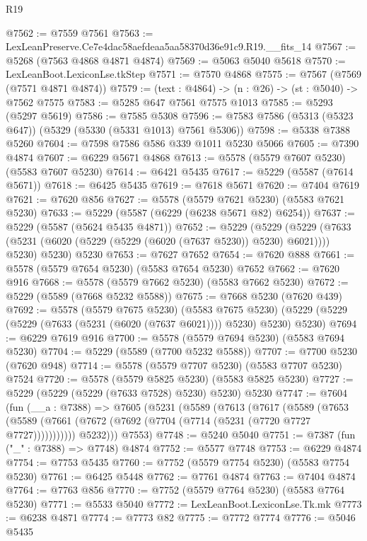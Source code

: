 \begin{lexlean}{R19}
\begin{coremodule}
@7562 := @7559 @7561
@7563 := LexLeanPreserve.Ce7e4dac58aefdeaa5aa58370d36e91c9.R19.__fits_14
@7567 := @5268 (@7563 @4868 @4871 @4874)
@7569 := @5063 @5040 @5618
@7570 := LexLeanBoot.LexiconLse.tkStep
@7571 := @7570 @4868
@7575 := @7567 (@7569 (@7571 @4871 @4874))
@7579 := (text : @4864) -> (n : @26) -> (st : @5040) -> @7562 @7575
@7583 := @5285 @647 @7561 @7575 @1013
@7585 := @5293 (@5297 @5619)
@7586 := @7585 @5308
@7596 := @7583 @7586 (@5313 (@5323 @647)) (@5329 (@5330 (@5331 @1013) @7561 @5306))
@7598 := @5338 @7388 @5260
@7604 := @7598 @7586 @586 @339 @1011 @5230 @5066
@7605 := @7390 @4874
@7607 := @6229 @5671 @4868
@7613 := @5578 (@5579 @7607 @5230) (@5583 @7607 @5230)
@7614 := @6421 @5435
@7617 := @5229 (@5587 (@7614 @5671))
@7618 := @6425 @5435
@7619 := @7618 @5671
@7620 := @7404 @7619
@7621 := @7620 @856
@7627 := @5578 (@5579 @7621 @5230) (@5583 @7621 @5230)
@7633 := @5229 (@5587 (@6229 (@6238 @5671 @82) @6254))
@7637 := @5229 (@5587 (@5624 @5435 @4871))
@7652 := @5229
    (@5229
      (@5229 (@7633 (@5231 (@6020 (@5229 (@5229 (@6020 (@7637 @5230)) @5230) @6021)))) @5230)
      @5230)
    @5230
@7653 := @7627 @7652
@7654 := @7620 @888
@7661 := @5578 (@5579 @7654 @5230) (@5583 @7654 @5230) @7652
@7662 := @7620 @916
@7668 := @5578 (@5579 @7662 @5230) (@5583 @7662 @5230)
@7672 := @5229 (@5589 (@7668 @5232 @5588))
@7675 := @7668 @5230 (@7620 @439)
@7692 := @5578
    (@5579 @7675 @5230)
    (@5583 @7675 @5230)
    (@5229 (@5229 (@5229 (@7633 (@5231 (@6020 (@7637 @6021)))) @5230) @5230) @5230)
@7694 := @6229 @7619 @916
@7700 := @5578 (@5579 @7694 @5230) (@5583 @7694 @5230)
@7704 := @5229 (@5589 (@7700 @5232 @5588))
@7707 := @7700 @5230 (@7620 @948)
@7714 := @5578 (@5579 @7707 @5230) (@5583 @7707 @5230) @7524
@7720 := @5578 (@5579 @5825 @5230) (@5583 @5825 @5230)
@7727 := @5229 (@5229 (@5229 (@7633 @7528) @5230) @5230) @5230
@7747 := @7604
    (fun (__a : @7388) =>
    @7605
      (@5231
        (@5589
          (@7613
            (@7617
              (@5589
                (@7653
                  (@5589 (@7661 (@7672 (@7692 (@7704 (@7714 (@5231 (@7720 @7727 @7727)))))))))))
            @5232)))
      @7553)
@7748 := @5240 @5040
@7751 := @7387 (fun ("_" : @7388) => @7748) @4874
@7752 := @5577 @7748
@7753 := @6229 @4874
@7754 := @7753 @5435
@7760 := @7752 (@5579 @7754 @5230) (@5583 @7754 @5230)
@7761 := @6425 @5448
@7762 := @7761 @4874
@7763 := @7404 @4874
@7764 := @7763 @856
@7770 := @7752 (@5579 @7764 @5230) (@5583 @7764 @5230)
@7771 := @5533 @5040
@7772 := LexLeanBoot.LexiconLse.Tk.mk
@7773 := @6238 @4871
@7774 := @7773 @82
@7775 := @7772 @7774
@7776 := @5046 @5435

\end{coremodule}
\end{lexlean}
